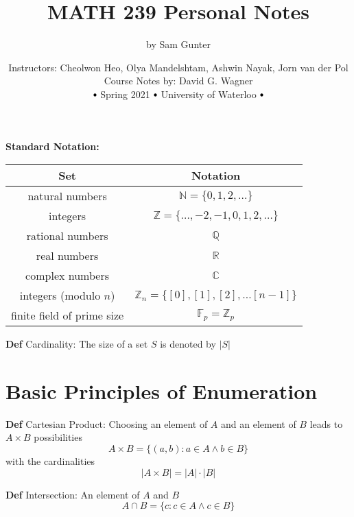 \documentclass[11pt,notitlepage]{report}
\makeatletter
\newcommand{\bb}[1]{\ensuremath{\mathbb{#1}}}
\newcommand{\tbf}[1]{\textbf{#1}}
\newcommand\sbullet[1][.75]{\mathbin{\vcenter{\hbox{\scalebox{#1}{$\bullet$}}}}}
\newcommand*{\toccontents}{\@starttoc{toc}}
\makeatother
\begin{document}
\parindent=0pt

\title{\vspace{-15mm}MATH 239 Personal Notes \vspace{-5mm}}
\author{by Sam Gunter}
\date{Instructors: Cheolwon Heo, Olya Mandelshtam, Ashwin Nayak, Jorn van der Pol \\ 
Course Notes by: David G. Wagner \\ 
$\sbullet$ Spring 2021 $\sbullet$ University of Waterloo $\sbullet$}
\maketitle

\toccontents
\vspace{4mm}
\textbf{Standard Notation:}
\renewcommand{\arraystretch}{1.35}
\begin{center}
\begin{tabular}{ | c c | } 
\hline
 \tbf{Set} & \tbf{Notation} \\ 
\hline
 natural numbers & $\bb N = \{0, 1, 2, \dots\}$ \\ 
\hline
 integers & $\bb Z = \{\dots, -2, -1, 0, 1, 2, \dots\}$ \\ 
\hline
 rational numbers & $\bb Q$\\ 
\hline
 real numbers & $\bb R$\\ 
\hline
 complex numbers & $\bb C$\\ 
\hline
 integers (modulo $n$) & $\bb Z_n = \{[0], [1], [2], \dots [n-1]\}$ \\ 
\hline
 finite field of prime size & $\bb F_p = \bb Z_p$\\
\hline
\end{tabular}
\end{center}
\renewcommand{\arraystretch}{1}

\textbf{Def} Cardinality: The size of a set $S$ is denoted by $|S|$

\thispagestyle{empty}
\newpage
\setcounter{page}{1}

\section{Basic Principles of Enumeration}

\textbf{Def} Cartesian Product: Choosing an element of $A$ and an element of $B$ leads to $A \times B$ possibilities
$$A \times B = \{(a, b): a \in A \wedge b \in B\}$$
with the cardinalities
$$|A \times B| = |A| \cdot |B|$$

\textbf{Def} Intersection: An element of $A$ and $B$
$$A \cap B = \{c: c \in A \wedge c \in B\}$$
\end{document}
